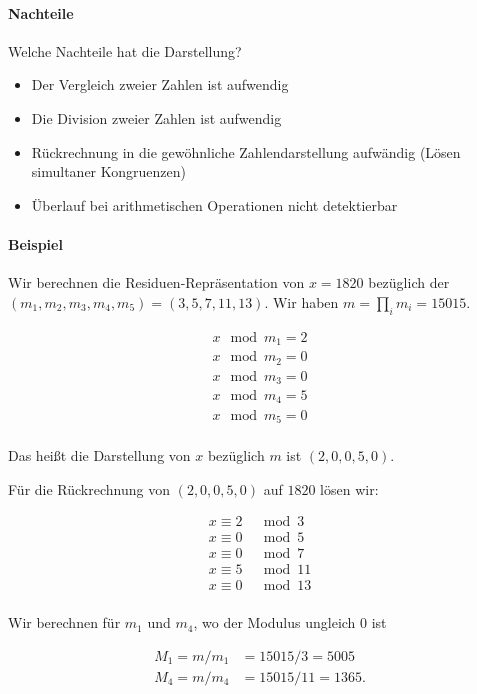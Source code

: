\paragraph{Nachteile}
Welche Nachteile hat die Darstellung?

\begin{itemize}
    \item Der Vergleich zweier Zahlen ist aufwendig
    \item Die Division zweier Zahlen ist aufwendig 
    \item Rückrechnung in die gewöhnliche Zahlendarstellung aufwändig (Lösen simultaner Kongruenzen)
    \item Überlauf bei arithmetischen Operationen nicht detektierbar
\end{itemize}

\paragraph{Beispiel}

Wir berechnen die Residuen-Repräsentation von $x = 1820$ bezüglich der $(m_1, m_2, m_3, m_4, m_5) = (3,5,7,11,13)$. Wir haben $m = \prod_i m_i = 15015$.

\begin{align*}
    x \mod m_1 = 2 \\
    x \mod m_2 = 0 \\
    x \mod m_3 = 0 \\
    x \mod m_4 = 5 \\
    x \mod m_5 = 0 \\
\end{align*}

Das heißt die Darstellung von $x$ bezüglich $m$ ist $(2,0,0,5,0)$.  

Für die Rückrechnung von $(2,0,0,5,0)$ auf $1820$ lösen wir:

\begin{align*}
    x \equiv 2 &\mod 3 \\
    x \equiv 0 &\mod 5 \\
    x \equiv 0 &\mod 7 \\
    x \equiv 5 &\mod 11 \\
    x \equiv 0 &\mod 13 \\
\end{align*}

Wir berechnen für $m_1$ und $m_4$, wo der Modulus ungleich 0 ist

\begin{align*}
    M_1 = m / m_1 &= 15015 / 3 = 5005 \\
    M_4 = m / m_4 &= 15015 / 11 = 1365.
\end{align*}

